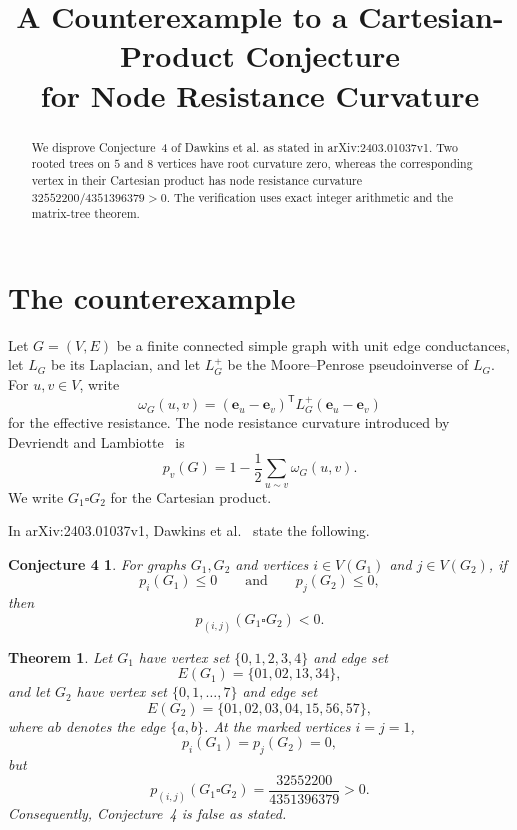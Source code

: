 \documentclass[11pt]{amsart}
\title[Counterexample for node resistance curvature]
{A Counterexample to a Cartesian-Product Conjecture\\
for Node Resistance Curvature}
\date{}
\newtheorem{theorem}{Theorem}
\newtheorem*{conjecture}{Conjecture 4}
\theoremstyle{remark}
\begin{document}
\begin{abstract}
We disprove Conjecture~4 of Dawkins et al. as stated in
arXiv:2403.01037v1. Two rooted trees on $5$ and $8$ vertices have root
curvature zero, whereas the corresponding vertex in their Cartesian
product has node resistance curvature
$32552200/4351396379>0$. The verification uses exact integer
arithmetic and the matrix-tree theorem.
\end{abstract}

\maketitle

\section{The counterexample}

Let $G=(V,E)$ be a finite connected simple graph with unit edge
conductances, let $L_G$ be its Laplacian, and let $L_G^+$ be the
Moore--Penrose pseudoinverse of $L_G$. For $u,v\in V$, write
\[
\omega_G(u,v)
=(\mathbf e_u-\mathbf e_v)^{\mathsf T}
L_G^+(\mathbf e_u-\mathbf e_v)
\]
for the effective resistance. The node resistance curvature introduced
by Devriendt and Lambiotte~\cite{DL} is
\[
p_v(G)=1-\frac12\sum_{u\sim v}\omega_G(u,v).
\]
We write $G_1\square G_2$ for the Cartesian product.

In arXiv:2403.01037v1, Dawkins et al.~\cite{DGKLQRS} state the
following.

\begin{conjecture}
For graphs $G_1,G_2$ and vertices $i\in V(G_1)$ and $j\in V(G_2)$, if
\[
p_i(G_1)\le 0
\qquad\text{and}\qquad
p_j(G_2)\le 0,
\]
then
\[
p_{(i,j)}(G_1\square G_2)<0.
\]
\end{conjecture}

\begin{theorem}
Let $G_1$ have vertex set $\{0,1,2,3,4\}$ and edge set
\[
E(G_1)=\{01,02,13,34\},
\]
and let $G_2$ have vertex set $\{0,1,\ldots,7\}$ and edge set
\[
E(G_2)=\{01,02,03,04,15,56,57\},
\]
where $ab$ denotes the edge $\{a,b\}$. At the marked vertices $i=j=1$,
\[
p_i(G_1)=p_j(G_2)=0,
\]
but
\[
p_{(i,j)}(G_1\square G_2)
=\frac{32552200}{4351396379}>0.
\]
Consequently, Conjecture~4 is false as stated.
\end{theorem}
\end{document}
